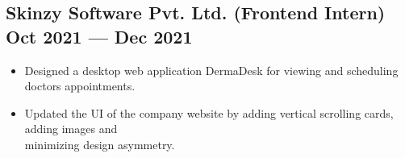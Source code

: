 \documentclass[a4,10pt]{article}
\newenvironment{zitemize}{
\begin{itemize}\itemsep0pt \parskip0pt \parsep1pt}
{\end{itemize}\vspace{-0.5cm}}
\begin{document}
\subsection*{Skinzy Software Pvt. Ltd. {\normalsize\normalfont (Frontend Intern)} \hfill Oct 2021 --- Dec 2021} 
    \begin{zitemize}
        \item Designed a desktop web application DermaDesk for viewing and
        scheduling doctors appointments.
        \item Updated the UI of the company website by adding vertical scrolling cards, adding images and\\minimizing design asymmetry.
    \end{zitemize}
\vspace{-0.3cm}


    
\end{document}
